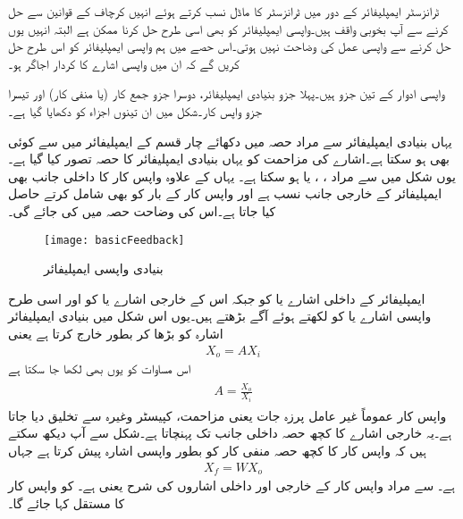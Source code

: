 ٹرانزسٹر ایمپلیفائر کے دور میں ٹرانزسٹر کا ماڈل نسب کرتے ہوئے انہیں کرچاف کے قوانین سے حل کرنے سے آپ بخوبی واقف ہیں۔واپسی ایمپلیفائر کو بھی اسی طرح حل کرنا ممکن ہے البتہ انہیں یوں حل کرنے سے واپسی عمل کی وضاحت نہیں ہوتی۔اس حصے میں ہم واپسی ایمپلیفائر کو اس طرح حل کریں گے کہ ان میں واپسی اشارے کا کردار اجاگر ہو۔

واپسی ادوار کے تین جزو ہیں۔پہلا جزو بنیادی ایمپلیفائر، دوسرا جزو جمع کار (یا منفی کار) اور تیسرا جزو واپس کار۔شکل  میں ان تینوں اجزاء کو دکھایا گیا ہے۔

یہاں بنیادی ایمپلیفائر سے مراد حصہ  میں دکھائے چار قسم کے ایمپلیفائر میں سے کوئی بھی ہو سکتا ہے۔اشارے کی مزاحمت  کو یہاں بنیادی ایمپلیفائر کا حصہ تصور کیا گیا ہے۔ یوں شکل  میں  سے مراد  ،  ،  یا  ہو سکتا ہے۔ یہاں  کے علاوہ واپس کار کا داخلی جانب  بھی ایمپلیفائر کے خارجی جانب نسب ہے  اور  واپس کار کے بار کو بھی شامل کرتے حاصل کیا جاتا ہے۔اس کی وضاحت حصہ  میں کی جائے گی۔
\begin{figure}
\centering
\texttt{[image: basicFeedback]}
\caption{بنیادی واپسی ایمپلیفائر}
\label{شکل_بنیادی_واپسی_ایمپلیفائر}
\end{figure}
ایمپلیفائر کے داخلی اشارے  یا  کو  جبکہ اس کے خارجی اشارے  یا  کو   اور اسی طرح واپسی اشارے  یا  کو  لکھتے ہوئے آگے بڑھتے ہیں۔یوں اس شکل میں بنیادی ایمپلیفائر اشارہ  کو بڑھا کر بطور  خارج کرتا ہے یعنی
\begin{align}
X_o = A X_i
\end{align}
 اس مساوات کو یوں بھی لکھا جا سکتا ہے
\begin{gather} \label{مساوات_واپسی_افزائش}
\begin{aligned}
A =\frac{X_o}{X_i}
\end{aligned}
\end{gather}
واپس کار عموماً غیر عامل پرزہ جات یعنی مزاحمت، کپیسٹر وغیرہ سے تخلیق دیا جاتا ہے۔یہ  خارجی اشارے کا کچھ حصہ داخلی جانب تک پہنچاتا ہے۔شکل سے آپ دیکھ سکتے ہیں کہ واپس کار   کا کچھ حصہ منفی کار کو بطور واپسی اشارہ   پیش کرتا ہے جہاں
\begin{align} \label{مساوات_واپسی_واپسی_اشارہ}
X_f = W X_o
\end{align}
ہے۔ سے مراد واپس کار کے خارجی اور داخلی اشاروں کی شرح یعنی  ہے۔ کو واپس کار کا مستقل کہا جائے گا۔

